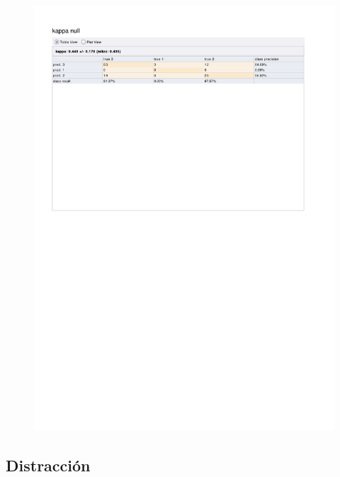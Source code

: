 \begin{figure}[htp]
  \centerline{\includegraphics[trim=0 680 0 80,clip,width=16.09cm]{results/ANN_K_Boredom.pdf}} \caption{
} \label{ANN_K_Boredom}
\end{figure}

\clearpage
\FloatBarrier
\subsection{Distracción}

